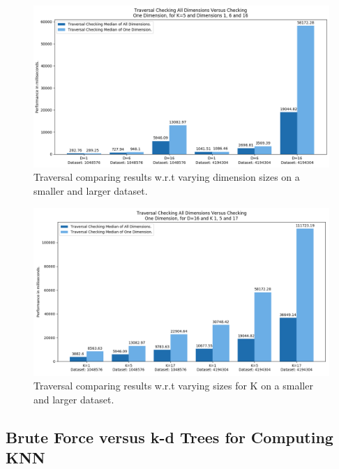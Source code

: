 \begin{figure}[H]
\centering
\includegraphics[width=1\textwidth]{pics/plot-figs/trav-k5-2.png}
\caption{Traversal comparing results w.r.t varying dimension sizes on a smaller and larger dataset.}
\end{figure}


\begin{figure}[H]
\centering
\includegraphics[width=1\textwidth]{pics/plot-figs/trav-d16.png}
\caption{Traversal comparing results w.r.t varying sizes for K on a smaller and larger dataset.}
\end{figure}





\subsection{Brute Force versus k-d Trees for Computing KNN}







